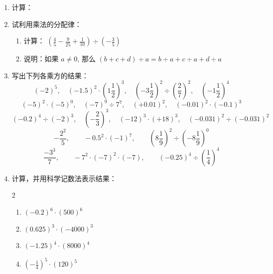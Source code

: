 \begin{enumerate}
\item 计算：
\begin{enumerate}
\end{enumerate}
\item 试利用乘法的分配律：
\begin{enumerate}
    \item 计算： $\left(\frac{4}{5}-\frac{9}{25}+\frac{1}{10}\right) \div\left(-\frac{3}{5}\right)$
    \item 说明：如果 $a \neq 0$, 那么 $(b+c+d)\div a=b \div a+c\div a+d\div a$
\end{enumerate}

\item 写出下列各乘方的结果：
\[(-2)^{5},\quad (-1.5)^{2} \cdot\left(1 \frac{1}{2}\right)^{3},\quad  \left(-3 \frac{1}{2}\right)^{2} \div\left(\frac{2}{7}\right)^{2} ,\quad \left(-1 \frac{1}{2}\right)^{4}\]
\[(-5)^{2} \cdot(-5)^{0} ,\quad(-7)^{9}\div 7^{7} ,\quad (+0.01)^2,\quad (-0.01)^2\cdot (-0.1)^3\]
\[(-0.2)^4\div (-2)^3,\quad \left(-\frac{2}{3}\right)^3,\quad (-12)^3\cdot (+18)^3,\quad (-0.031)^2\div (-0.031)^2\]
\[-\frac{2^2}{5},\qquad -0.5^2\cdot (-1)^7,\qquad \left(8\frac{1}{9}\right)^2\div \left(-8\frac{1}{9}\right)^0\]
\[\frac{-3^3}{7},\qquad -7^2\cdot (-7)^2\cdot (-7),\qquad (-0.25)^4\div \left(\frac{1}{4}\right)^4\]

\item  计算，并用科学记数法表示结果：
\begin{multicols}{2}
    \begin{enumerate}
        \item $(-0.2)^6\cdot (500)^6$
        \item $(0.625)^3\cdot (-4000)^3$
        \item $(-1.25)^4\cdot (8000)^4$
        \item $\left(-\frac{1}{4}\right)^5\cdot (120)^5$
    \end{enumerate}
\end{multicols}


\end{enumerate}
